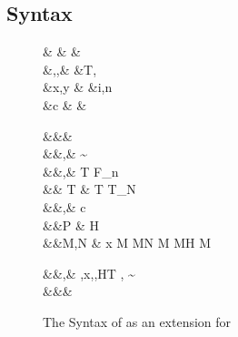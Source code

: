 \documentclass[screen,nonacm,manuscript,review]{acmart} %
\begin{document}
\subsection{Syntax}\label{sec:sfp-syntax}
\begin{figure}[ht]
 \centering
 \begin{syntax}
  & &  & \\
  &\TyVar,\beta,\Co &\qquad{} &T, \\
  &x,y &\qquad{} &i,n \in {} \\
  &c & &
 \end{syntax}
 \begin{syntax}
  &&\square & \\
  &&\kappa,\eta \bnfeq& \STAR \bnfor
                                  \kappa \to \kappa \bnfor \sigma\sim\tau \bnfor \shl{\chi} \bnfor {}\\
  &&\tau,\sigma \bnfeq& \TyVar \bnfor T
                                  \bnfor \tau \to \tau \bnfor
                                  \tau\App\tau \bnfor \Forall {\TyVar\co\kappa} \tau  \bnfor F_n
                                  \bnfor \shl{\Forall \chi \tau} \bnfor \shl{\tau\App\kappa} \bnfor {}\\
  && T \bnfeq& T \bnfor T_N\\
  &&\nu,\Co \bnfeq& c \bnfor \Refl\tau \bnfor \Sym\Co \bnfor \Trans\nu\Co %
 \bnfor \Forall {\TyVar\co\kappa} \Co \bnfor \Co\At\tau %
 \bnfor \nu\App\Co \bnfor \Left \Co \bnfor \Right \Co  %
 \bnfor \shl{\Forall \chi \Co} \bnfor \shl{\Co\App\chi} %
 \bnfor \shl{\Co\At\chi}\\
  &&P \bnfeq& H \App\shl{\many\chi}\App\many{\TyVar\co\kappa} \\
  &&M,N \bnfeq& x \bnfor {} M \bnfor M\App N \bnfor \TLam{\tau\co\kappa} M \bnfor M\App \tau \bnfor H \bnfor \Case M  \bnfor \Cast \Tm \Co %
 \bnfor \shl{\TLam \chi \Tm} \bnfor \shl{\Tm\App\kappa} \\

 \end{syntax}
 \begin{syntax}
  &&\TEnv,\Delta \bnfeq& \empt \bnfor \TEnv,x\co\tau \bnfor \TEnv,\TyVar\co\kappa \bnfor \TEnv,H\co T \bnfor \TEnv, \Co \co \tau\sim\sigma\\
  &&\Subst \bnfeq& \empt \bnfor \Set{\many{\TyVar \mapsto \tau}}
 \end{syntax}
 \caption{The Syntax of \SFP as an extension for \SFC}
 \label{fig:sfp-syntax}
\end{figure}
\end{document}
